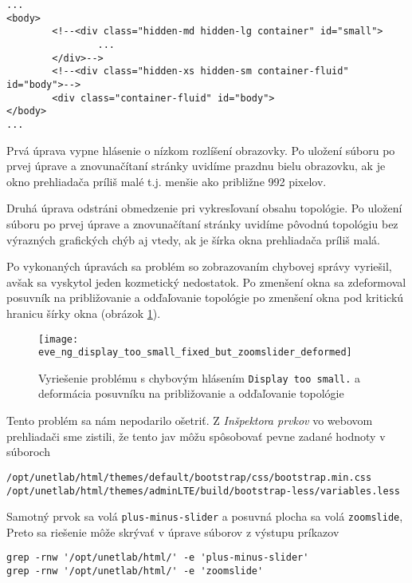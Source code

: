 \begin{Verbatim}[samepage=true]
...
<body>
        <!--<div class="hidden-md hidden-lg container" id="small">
                ...
        </div>-->
        <!--<div class="hidden-xs hidden-sm container-fluid" id="body">-->
        <div class="container-fluid" id="body">
</body>
...
\end{Verbatim}

Prvá úprava vypne hlásenie o nízkom rozlíšení obrazovky. Po uložení súboru po prvej úprave a znovunačítaní stránky uvidíme prazdnu bielu obrazovku, ak je okno prehliadača príliš malé t.j. menšie ako približne 992 pixelov.

Druhá úprava odstráni obmedzenie pri vykresľovaní obsahu topológie. Po uložení súboru po prvej úprave a znovunačítaní stránky uvidíme pôvodnú topológiu bez výrazných grafických chýb aj vtedy, ak je šírka okna prehliadača príliš malá.

Po vykonaných úpravách sa problém so zobrazovaním chybovej správy vyriešil, avšak sa vyskytol jeden kozmetický nedostatok. Po zmenšení okna sa zdeformoval posuvník na približovanie a odďaľovanie topológie po zmenšení okna pod kritickú hranicu šírky okna (obrázok \ref{obr:eve_ng_display_too_small_fixed_but_zoomslider_deformed}).

\begin{figure}
    \centering
    \texttt{[image: eve\_ng\_display\_too\_small\_fixed\_but\_zoomslider\_deformed]}
    \caption{Vyriešenie problému s chybovým hlásením \texttt{Display too small.} a deformácia posuvníku na približovanie a odďaľovanie topológie}
    \label{obr:eve_ng_display_too_small_fixed_but_zoomslider_deformed}
\end{figure}

Tento problém sa nám nepodarilo ošetriť. Z \emph{Inšpektora prvkov} vo webovom prehliadači sme zistili, že tento jav môžu spôsobovať pevne zadané hodnoty v súboroch
\begin{Verbatim}[samepage=true]
/opt/unetlab/html/themes/default/bootstrap/css/bootstrap.min.css
/opt/unetlab/html/themes/adminLTE/build/bootstrap-less/variables.less
\end{Verbatim}

Samotný prvok sa volá \texttt{plus-minus-slider} a posuvná plocha sa volá \texttt{zoomslide}, Preto sa riešenie môže skrývať v úprave súborov z výstupu príkazov
\begin{Verbatim}[samepage=true]
grep -rnw '/opt/unetlab/html/' -e 'plus-minus-slider'
grep -rnw '/opt/unetlab/html/' -e 'zoomslide'
\end{Verbatim}


